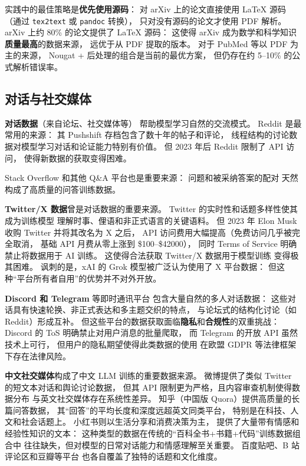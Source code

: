 实践中的最佳策略是\textbf{优先使用源码}：
对 arXiv 上的论文直接使用 \LaTeX{} 源码
（通过 \texttt{tex2text} 或 \texttt{pandoc} 转换），
只对没有源码的论文才使用 PDF 解析。
arXiv 上约 80\% 的论文提供了 \LaTeX{} 源码：
这使得 arXiv 成为数学和科学知识
\textbf{质量最高}的数据来源，
远优于从 PDF 提取的版本。
对于 PubMed 等以 PDF 为主的来源，
Nougat + 后处理的组合是当前的最优方案，
但仍存在约 5--10\% 的公式解析错误率。

\subsection{对话与社交媒体}

\textbf{对话数据}（来自论坛、社交媒体等）
帮助模型学习自然的交流模式。
Reddit 是最常用的来源：
其 Pushshift 存档包含了数十年的帖子和评论，
线程结构的讨论数据对模型学习对话和论证能力特别有价值。
但 2023 年后 Reddit 限制了 API 访问，
使得新数据的获取变得困难。

Stack Overflow 和其他 Q\&A 平台也是重要来源：
问题和被采纳答案的配对
天然构成了高质量的问答训练数据。

\textbf{Twitter/X 数据}曾是对话数据的重要来源。
Twitter 的实时性和话题多样性使其成为训练模型
理解时事、俚语和非正式语言的关键语料。
但 2023 年 Elon Musk 收购 Twitter 并将其改名为 X 之后，
API 访问费用大幅提高（免费访问几乎被完全取消，
基础 API 月费从零上涨到 \$100--\$42000），
同时 Terms of Service 明确禁止将数据用于 AI 训练。
这使得合法获取 Twitter/X 数据用于模型训练
变得极其困难。
讽刺的是，xAI 的 Grok 模型被广泛认为使用了 X 平台数据：
但这种“平台所有者自用”的优势并不对外开放。

\textbf{Discord 和 Telegram} 等即时通讯平台
包含大量自然的多人对话数据：
这些对话具有快速轮换、非正式表达和多主题交织的特点，
与论坛式的结构化讨论（如 Reddit）形成互补。
但这些平台的数据获取面临\textbf{隐私}和\textbf{合规性}的双重挑战：
Discord 的 ToS 明确禁止对用户消息的批量爬取，
而 Telegram 的开放 API 虽然技术上可行，
但用户的隐私期望使得此类数据的使用
在欧盟 GDPR 等法律框架下存在法律风险。

\textbf{中文社交媒体}构成了中文 LLM 训练的重要数据来源。
微博提供了类似 Twitter 的短文本对话和舆论讨论数据，
但其 API 限制更为严格，且内容审查机制使得数据分布
与英文社交媒体存在系统性差异。
知乎（中国版 Quora）提供高质量的长篇问答数据，
其“回答”的平均长度和深度远超英文同类平台，
特别是在科技、人文和社会话题上。
小红书则以生活分享和消费决策为主，
提供了大量带有情感和经验性知识的文本：
这种类型的数据在传统的“百科全书+书籍+代码”训练数据组合中
往往缺失，但对模型的日常对话能力和情感理解至关重要。
百度贴吧、B 站评论区和豆瓣等平台
也各自覆盖了独特的话题和文化维度。

